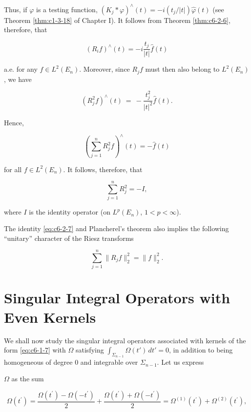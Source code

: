 Thus, if $\varphi$ is a testing function, $(K_j * \varphi)^\wedge(t) = -i(t_j / |t|) \hat{\varphi}(t)$ (see Theorem \ref{thm:c1-3-18} of Chapter I). It follows from Theorem \ref{thm:c6-2-6}, therefore, that

\begin{equation}\label{eq:c6-2-7}
(R_{i}f)^{\wedge}(t)=-i\frac{t_{j}}{|t|}\hat{f}(t)
\end{equation}

a.e. for any $f \in L^2(E_n)$. Moreover, since $R_j f$ must then also belong to $L^2(E_n)$, we have

\[
(R_{j}^{2}f)^{\wedge}(t)\:=\:-{\frac{t_{j}^{2}}{|t|^{2}}}\hat{f}(t).
\]

Hence,

\begin{equation}\label{eq:c6-2-8}
\left(\sum_{j=1}^{n}R_{j}^{2}f\right)^{\wedge}(t)=-\widehat{f}(t)
\end{equation}

for all $f \in L^2(E_n)$. It follows, therefore, that

\begin{equation}\label{eq:c6-2-9}
\sum_{j=1}^{n}R_{j}^{2}=-I,
\end{equation}

where $I$ is the identity operator (on $L^{p}(E_{n})$, $1 < p < \infty$).

The identity \eqref{eq:c6-2-7} and Plancherel's theorem also implies the following ``unitary'' character of the Riesz transforms

\begin{equation}\label{eq:c6-2-10}
\sum_{j=1}^{n}\|R_{j}f\|_{2}^{2}=\|f\|_{2}^{2}.
\end{equation}

\section{Singular Integral Operators with Even Kernels}

We shall now study the singular integral operators associated with kernels of the form \eqref{eq:c6-1-7} with $\Omega$ satisfying $\int_{\Sigma_{n-1}} \Omega(t') \, dt' = 0$, in addition to being homogeneous of degree 0 and integrable over $\Sigma_{n-1}$. Let us express

$\Omega$ as the sum

\[
\Omega(t^{\prime})=\frac{\Omega(t^{\prime})-\Omega(-t^{\prime})}{2}+\frac{\Omega(t^{\prime})+\Omega(-t^{\prime})}{2}=\Omega^{(1)}(t^{\prime})+\Omega^{(2)}(t^{\prime}),
\]

